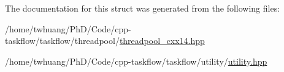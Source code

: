 The documentation for this struct was generated from the following files\+:\begin{DoxyCompactItemize}
\item 
/home/twhuang/\+Ph\+D/\+Code/cpp-\/taskflow/taskflow/threadpool/\hyperlink{threadpool__cxx14_8hpp}{threadpool\+\_\+cxx14.\+hpp}\item 
/home/twhuang/\+Ph\+D/\+Code/cpp-\/taskflow/taskflow/utility/\hyperlink{utility_8hpp}{utility.\+hpp}\end{DoxyCompactItemize}
